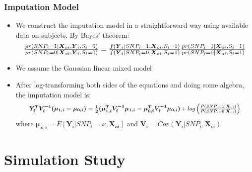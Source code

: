 \documentclass[pdf]{beamer}
\begin{document}
\begin{frame}
\frametitle{Imputation Model}
\begin{itemize}
	\setlength\itemsep{0.8em}
	\item We construct the imputation model in a straightforward way using available data on subjects. By Bayes' theorem:
	\begin{equation}\nonumber
	\resizebox{.95 \textwidth}{!} 
	{
	$\frac{pr(SNP_{i} = 1 | \boldsymbol{X}_{oi}, \boldsymbol{Y}_i, S_i = 0)}{pr(SNP_{i} = 0 | \boldsymbol{X}_{oi}, \boldsymbol{Y}_i, S_i = 0)} = \frac{f(\boldsymbol{Y}_i | SNP_{i}  = 1, \boldsymbol{X}_{oi}, S_i = 1)}{f(\boldsymbol{Y}_i |SNP_{i} = 0, \boldsymbol{X}_{oi}, S_i = 1)}
	\frac{pr(SNP_{i} = 1 | \boldsymbol{X}_{oi}, S_i = 1)}{pr(SNP_{i} = 0 | \boldsymbol{X}_{oi},S_i = 1)}$
	}
	\end{equation}

	\item We assume the Gaussian linear mixed model 
	\item After log-transforming both sides of the equations and doing some algebra, the imputation model is:
	\begin{equation}\nonumber
	\resizebox{.9 \textwidth}{!} 
	{
	$\boldsymbol{Y^{T}_i V_i^{-1}(\mu_{1,i} - \mu_{0,i}) - \frac{1}{2}(\mu_{1,i}^TV_i^{-1}\mu_{1,i} - \mu_{0,i}^TV_i^{-1}\mu_{0,i})}
	+ log\left(\frac{P(SNP_{i} = 1 | \boldsymbol{X}_{oi})}{P(SNP_{i} = 0 | \boldsymbol{X}_{oi})}\right)$
	}
	\end{equation}
	where $\boldsymbol{\mu_{x,i}} = E[\boldsymbol{Y}_i | SNP_{i} = x, \boldsymbol{X_{oi}}]$ and $\boldsymbol{V}_i = Cov(\boldsymbol{Y}_i | SNP_{i}, \boldsymbol{X}_{oi})$
\end{itemize}
\end{frame}


\section{Simulation Study}
\end{document}
